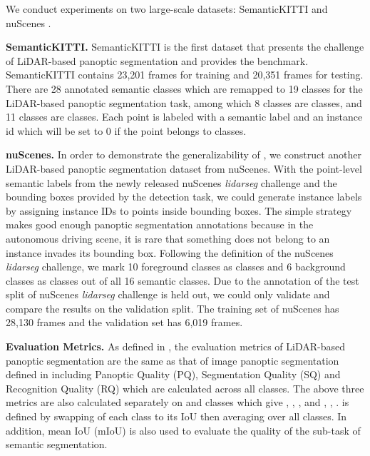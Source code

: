 \documentclass[final]{cvpr}
\begin{document}
We conduct experiments on two large-scale datasets: SemanticKITTI \cite{behley2019semantickitti} and
nuScenes \cite{nuscenes2019}.

\noindent\textbf{SemanticKITTI.}
SemanticKITTI is the first dataset that presents the challenge of LiDAR-based panoptic segmentation
and provides the benchmark\cite{behley2020benchmark}.
SemanticKITTI contains 23,201 frames for training and 20,351 frames for testing.
There are 28 annotated semantic classes which are remapped to 19 classes for the LiDAR-based panoptic segmentation task,
among which 8 classes are \things{} classes, and 11 classes are \stuff{} classes.
Each point is labeled with a semantic label and an instance id which will be set to 0 if the point belongs to
\stuff{} classes.

\noindent\textbf{nuScenes.}
In order to demonstrate the generalizability of \nickname{}, we construct another LiDAR-based panoptic
segmentation dataset from nuScenes.
With the point-level semantic labels from the newly released nuScenes \textit{lidarseg} challenge and the bounding
boxes provided by the detection task, we could generate instance labels by assigning instance IDs to
points inside bounding boxes.
The simple strategy makes good enough panoptic segmentation annotations because in the
autonomous driving scene, it is rare that something does not belong to an instance invades its bounding
box.
Following the definition of the nuScenes \textit{lidarseg} challenge, we mark 10 foreground classes as \things{} classes
and 6 background classes as \stuff{} classes out of all 16 semantic classes.
Due to the annotation of the test split of nuScenes \textit{lidarseg} challenge is held out, we could only validate
and compare the results on the validation split.
The training set of nuScenes has 28,130 frames and the validation set has 6,019 frames.

\noindent\textbf{Evaluation Metrics.}
As defined in \cite{behley2020benchmark}, the evaluation metrics of LiDAR-based panoptic segmentation are the
same as that of image panoptic segmentation defined in \cite{kirillov2019panoptic} including Panoptic Quality
(PQ), Segmentation Quality (SQ) and Recognition Quality (RQ) which are calculated across all classes.
The above three metrics are also calculated separately on \things{} and \stuff{} classes which give
\PQth{}, \SQth{}, \RQth{}, and \PQst{}, \SQst{}, \RQst{}.
\PQda{} is defined by swapping \PQ{} of each \stuff{} class to its IoU then averaging over all classes.
In addition, mean IoU (mIoU) is also used to evaluate the quality of the sub-task of
semantic segmentation.
\end{document}
